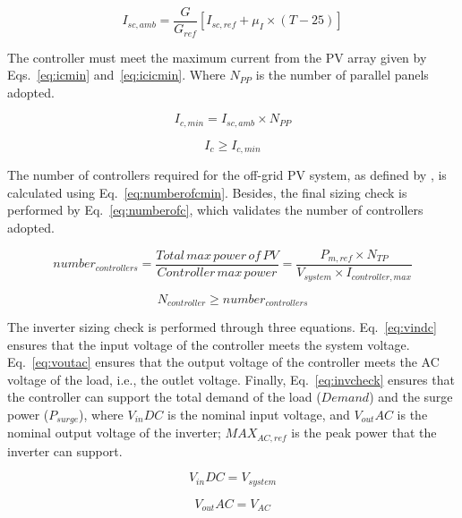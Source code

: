 \documentclass[12pt,a4paper]{article}
\begin{document}
\begin{equation}
\label{eq:iscamb}
I_{sc,amb} = \dfrac{G}{G_{ref}} \left[ I_{sc,ref} + \mu_{I} \times (T-25) \right] 
\end{equation}

The controller must meet the maximum current from the PV array given by Eqs.~\eqref{eq:icmin} and~\eqref{eq:icicmin}. Where $N_{PP}$ is the number of parallel panels adopted.

\begin{equation}
\label{eq:icmin}
I_{c,min} = I_{sc,amb} \times N_{PP}
\end{equation}

\begin{equation}
\label{eq:icicmin}
I_{c} \geq I_{c,min}
\end{equation}

The number of controllers required for the off-grid PV system, as defined by \cite{Yatimi}, is calculated using Eq.~\eqref{eq:numberofcmin}. Besides, the final sizing check is performed by Eq.~\eqref{eq:numberofc}, which validates the number of controllers adopted.

\begin{equation}
\label{eq:numberofcmin}
number_{controllers} = \dfrac{Total \, max \, power \, of \, PV}{Controller \, max \, power} = \dfrac{P_{m,ref} \times N_{TP}}{V_{system} \times I_{controller,max}}
\end{equation}

\begin{equation}
\label{eq:numberofc}
N_{controller} \geq number_{controllers}
\end{equation}

The inverter sizing check is performed through three equations. Eq.~\eqref{eq:vindc} ensures that the input voltage of the controller meets the system voltage. Eq.~\eqref{eq:voutac} ensures that the output voltage of the controller meets the AC voltage of the load, i.e., the outlet voltage. Finally, Eq.~\eqref{eq:invcheck} ensures that the controller can support the total demand of the load ($Demand$) and the surge power ($P_{surge}$), where $V_{in}DC$ is the nominal input voltage, and $V_{out}AC$ is the nominal output voltage of the inverter; $MAX_{AC,ref}$ is the peak power that the inverter can support.

\begin{equation}
\label{eq:vindc} 
V_{in}DC = V_{system}
\end{equation}

\begin{equation}
\label{eq:voutac} 
V_{out}AC = V_{AC}
\end{equation}
\end{document}
